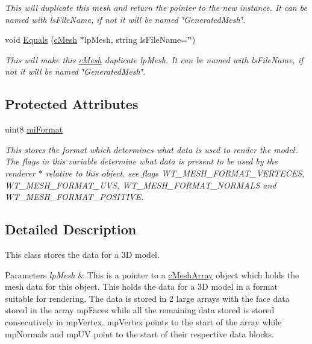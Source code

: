\begin{DoxyCompactItemize}
\begin{DoxyCompactList}\small\item\em This will duplicate this mesh and return the pointer to the new instance. It can be named with lsFileName, if not it will be named \char`\"{}GeneratedMesh\char`\"{}. \end{DoxyCompactList}\item 
\hypertarget{classc_mesh_a637f8906a64eef54f320b59e8064a725}{
void \hyperlink{classc_mesh_a637f8906a64eef54f320b59e8064a725}{Equals} (\hyperlink{classc_mesh}{cMesh} $\ast$lpMesh, string lsFileName=\char`\"{}\char`\"{})}
\label{classc_mesh_a637f8906a64eef54f320b59e8064a725}

\begin{DoxyCompactList}\small\item\em This will make this \hyperlink{classc_mesh}{cMesh} duplicate lpMesh. It can be named with lsFileName, if not it will be named \char`\"{}GeneratedMesh\char`\"{}. \end{DoxyCompactList}\end{DoxyCompactItemize}
\subsection*{Protected Attributes}
\begin{DoxyCompactItemize}
\item 
\hypertarget{classc_mesh_a6a9c96e41eef3faed3c43ab69e8be5c6}{
uint8 \hyperlink{classc_mesh_a6a9c96e41eef3faed3c43ab69e8be5c6}{miFormat}}
\label{classc_mesh_a6a9c96e41eef3faed3c43ab69e8be5c6}

\begin{DoxyCompactList}\small\item\em This stores the format which determines what data is used to render the model. The flags in this variable determine what data is present to be used by the renderer $\ast$ relative to this object. see flags WT\_\-MESH\_\-FORMAT\_\-VERTECES, WT\_\-MESH\_\-FORMAT\_\-UVS, WT\_\-MESH\_\-FORMAT\_\-NORMALS and WT\_\-MESH\_\-FORMAT\_\-POSITIVE. \end{DoxyCompactList}\end{DoxyCompactItemize}


\subsection{Detailed Description}
This class stores the data for a 3D model. 


\begin{DoxyParams}{Parameters}
{\em lpMesh} & This is a pointer to a \hyperlink{classc_mesh_array}{cMeshArray} object which holds the mesh data for this object. This holds the data for a 3D model in a format suitable for rendering. The data is stored in 2 large arrays with the face data stored in the array mpFaces while all the remaining data stored is stored consecutively in mpVertex. mpVertex points to the start of the array while mpNormals and mpUV point to the start of their respective data blocks. \\
\hline
\end{DoxyParams}
